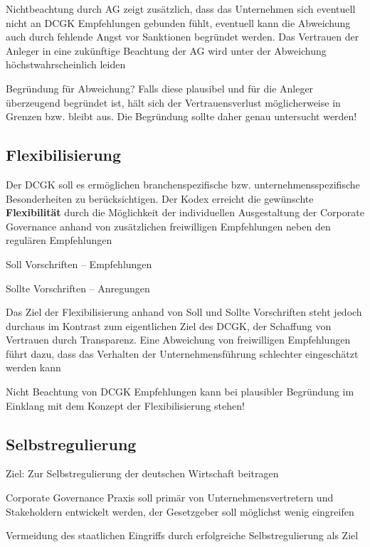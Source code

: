 \documentclass[
]{article}
\begin{document}
Nichtbeachtung durch AG zeigt zusätzlich, dass das Unternehmen sich
eventuell nicht an DCGK Empfehlungen gebunden fühlt, eventuell kann die
Abweichung auch durch fehlende Angst vor Sanktionen begründet werden.
Das Vertrauen der Anleger in eine zukünftige Beachtung der AG wird unter
der Abweichung höchstwahrscheinlich leiden

Begründung für Abweichung? Falls diese plausibel und für die Anleger
überzeugend begründet ist, hält sich der Vertrauensverlust
möglicherweise in Grenzen bzw. bleibt aus. Die Begründung sollte daher
genau untersucht werden!

\hypertarget{flexibilisierung}{%
\subsection{Flexibilisierung}\label{flexibilisierung}}

Der DCGK soll es ermöglichen branchenspezifische bzw.
unternehmensspezifische Besonderheiten zu berücksichtigen. Der Kodex
erreicht die gewünschte \textbf{Flexibilität} durch die Möglichkeit der
individuellen Ausgestaltung der Corporate Governance anhand von
zusätzlichen freiwilligen Empfehlungen neben den regulären Empfehlungen

Soll Vorschriften -- Empfehlungen

Sollte Vorschriften -- Anregungen

Das Ziel der Flexibilisierung anhand von Soll und Sollte Vorschriften
steht jedoch durchaus im Kontrast zum eigentlichen Ziel des DCGK, der
Schaffung von Vertrauen durch Transparenz. Eine Abweichung von
freiwilligen Empfehlungen führt dazu, dass das Verhalten der
Unternehmensführung schlechter eingeschätzt werden kann

Nicht Beachtung von DCGK Empfehlungen kann bei plausibler Begründung im
Einklang mit dem Konzept der Flexibilisierung stehen!

\hypertarget{selbstregulierung}{%
\subsection{Selbstregulierung}\label{selbstregulierung}}

Ziel: Zur Selbstregulierung der deutschen Wirtschaft beitragen

Corporate Governance Praxis soll primär von Unternehmensvertretern und
Stakeholdern entwickelt werden, der Gesetzgeber soll möglichst wenig
eingreifen

Vermeidung des staatlichen Eingriffs durch erfolgreiche
Selbstregulierung als Ziel
\end{document}
